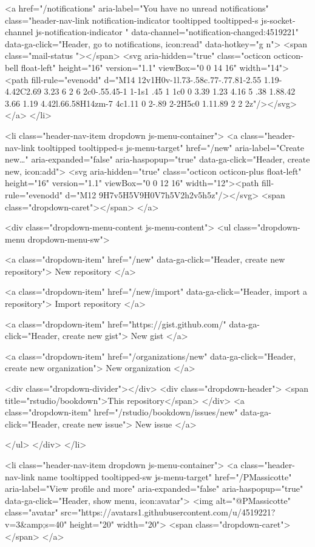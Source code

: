     <a href="/notifications" aria-label="You have no unread notifications" class="header-nav-link notification-indicator tooltipped tooltipped-s js-socket-channel js-notification-indicator " data-channel="notification-changed:4519221" data-ga-click="Header, go to notifications, icon:read" data-hotkey="g n">
        <span class="mail-status "></span>
        <svg aria-hidden="true" class="octicon octicon-bell float-left" height="16" version="1.1" viewBox="0 0 14 16" width="14"><path fill-rule="evenodd" d="M14 12v1H0v-1l.73-.58c.77-.77.81-2.55 1.19-4.42C2.69 3.23 6 2 6 2c0-.55.45-1 1-1s1 .45 1 1c0 0 3.39 1.23 4.16 5 .38 1.88.42 3.66 1.19 4.42l.66.58H14zm-7 4c1.11 0 2-.89 2-2H5c0 1.11.89 2 2 2z"/></svg>
</a>
  </li>

  <li class="header-nav-item dropdown js-menu-container">
    <a class="header-nav-link tooltipped tooltipped-s js-menu-target" href="/new"
       aria-label="Create new…"
       aria-expanded="false"
       aria-haspopup="true"
       data-ga-click="Header, create new, icon:add">
      <svg aria-hidden="true" class="octicon octicon-plus float-left" height="16" version="1.1" viewBox="0 0 12 16" width="12"><path fill-rule="evenodd" d="M12 9H7v5H5V9H0V7h5V2h2v5h5z"/></svg>
      <span class="dropdown-caret"></span>
    </a>

    <div class="dropdown-menu-content js-menu-content">
      <ul class="dropdown-menu dropdown-menu-sw">
        
<a class="dropdown-item" href="/new" data-ga-click="Header, create new repository">
  New repository
</a>

  <a class="dropdown-item" href="/new/import" data-ga-click="Header, import a repository">
    Import repository
  </a>

<a class="dropdown-item" href="https://gist.github.com/" data-ga-click="Header, create new gist">
  New gist
</a>

  <a class="dropdown-item" href="/organizations/new" data-ga-click="Header, create new organization">
    New organization
  </a>



  <div class="dropdown-divider"></div>
  <div class="dropdown-header">
    <span title="rstudio/bookdown">This repository</span>
  </div>
    <a class="dropdown-item" href="/rstudio/bookdown/issues/new" data-ga-click="Header, create new issue">
      New issue
    </a>

      </ul>
    </div>
  </li>

  <li class="header-nav-item dropdown js-menu-container">
    <a class="header-nav-link name tooltipped tooltipped-sw js-menu-target" href="/PMassicotte"
       aria-label="View profile and more"
       aria-expanded="false"
       aria-haspopup="true"
       data-ga-click="Header, show menu, icon:avatar">
      <img alt="@PMassicotte" class="avatar" src="https://avatars1.githubusercontent.com/u/4519221?v=3&amp;s=40" height="20" width="20">
      <span class="dropdown-caret"></span>
    </a>

